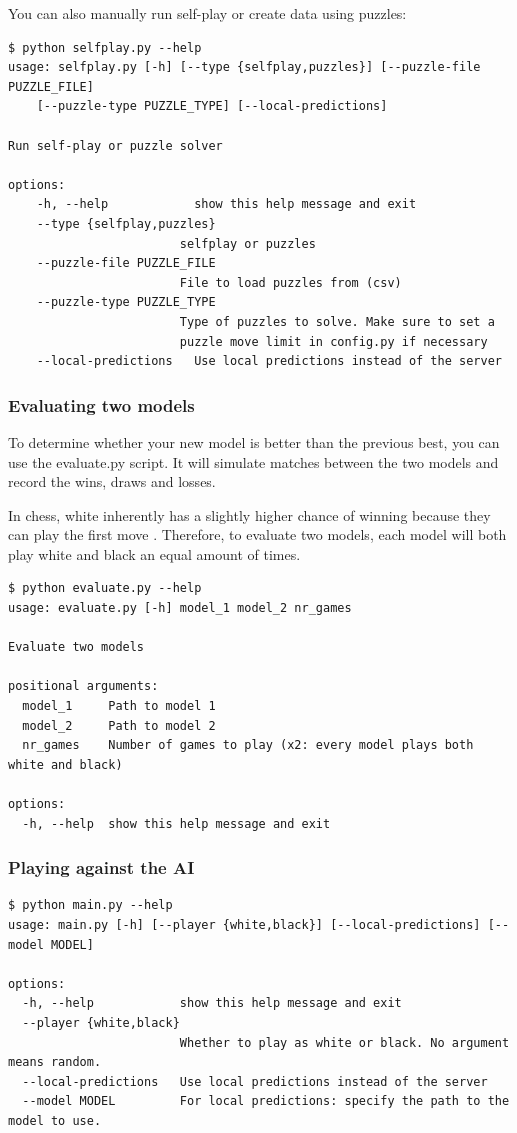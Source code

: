 \documentclass{article}
\begin{document}
You can also manually run self-play or create data using puzzles:

\begin{verbatim}
$ python selfplay.py --help
usage: selfplay.py [-h] [--type {selfplay,puzzles}] [--puzzle-file PUZZLE_FILE] 
    [--puzzle-type PUZZLE_TYPE] [--local-predictions]

Run self-play or puzzle solver

options:
    -h, --help            show this help message and exit
    --type {selfplay,puzzles}
                        selfplay or puzzles
    --puzzle-file PUZZLE_FILE
                        File to load puzzles from (csv)
    --puzzle-type PUZZLE_TYPE
                        Type of puzzles to solve. Make sure to set a 
                        puzzle move limit in config.py if necessary
    --local-predictions   Use local predictions instead of the server
\end{verbatim}

\subsubsection{Evaluating two models}

To determine whether your new model is better than the previous best, you can use the evaluate.py script.
It will simulate matches between the two models and record the wins, draws and losses.

In chess, white inherently has a slightly higher chance of winning because they can play the first move \cite{FirstmoveAdvantageChess2022}.
Therefore, to evaluate two models, each model will both play white and black an equal amount of times.

\begin{verbatim}
$ python evaluate.py --help
usage: evaluate.py [-h] model_1 model_2 nr_games

Evaluate two models

positional arguments:
  model_1     Path to model 1
  model_2     Path to model 2
  nr_games    Number of games to play (x2: every model plays both white and black)

options:
  -h, --help  show this help message and exit
\end{verbatim}

\subsubsection{Playing against the AI}

\begin{verbatim}
$ python main.py --help
usage: main.py [-h] [--player {white,black}] [--local-predictions] [--model MODEL]

options:
  -h, --help            show this help message and exit
  --player {white,black}
                        Whether to play as white or black. No argument means random.
  --local-predictions   Use local predictions instead of the server
  --model MODEL         For local predictions: specify the path to the model to use.
\end{verbatim}
\end{document}
